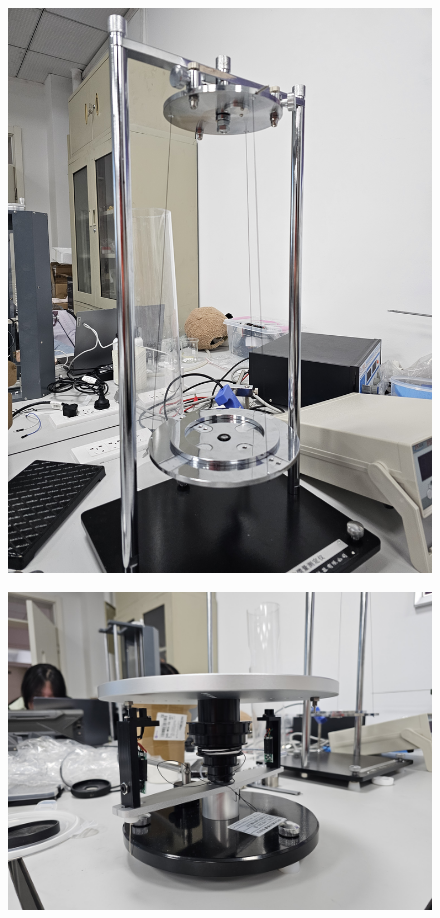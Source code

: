 \documentclass[12pt,hyperref,a4paper,UTF8]{ctexart}
\begin{document}
\begin{figure}[H]
    \centering
    \includegraphics[scale=0.1,angle=270]{3line.jpg}
    \caption{}
\end{figure}


\begin{figure}[H]
    \centering
    \includegraphics[scale=0.1]{freefall.jpg}
    \caption{}
\end{figure}
\end{document}
